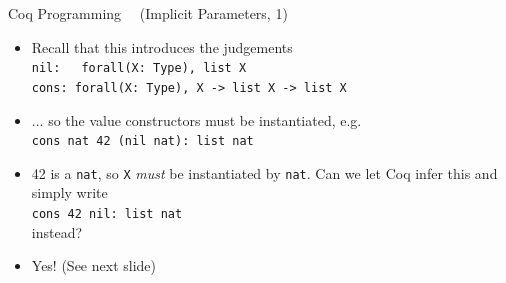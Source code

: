 \begin{frame}[fragile]{Coq Programming\small~~ (Implicit Parameters, 1)}

\begin{itemize}
  \item Recall that this introduces the judgements\\
  \lstinline|nil:| ~~\,\lstinline|forall(X: Type), list X|\\
  \lstinline|cons: forall(X: Type), X -> list X -> list X|

  \pause

  \item ... so the value constructors must be instantiated, e.g.\\
  \lstinline|cons nat 42 (nil nat): list nat|

  \pause

  \item 42 is a \lstinline|nat|, so \lstinline|X| \textit{must} be instantiated by \lstinline|nat|. Can we let Coq infer this and simply write\\
  \lstinline|cons 42 nil: list nat|\\
  instead?

  \pause

  \item Yes! (See next slide)
\end{itemize}
\end{frame}

